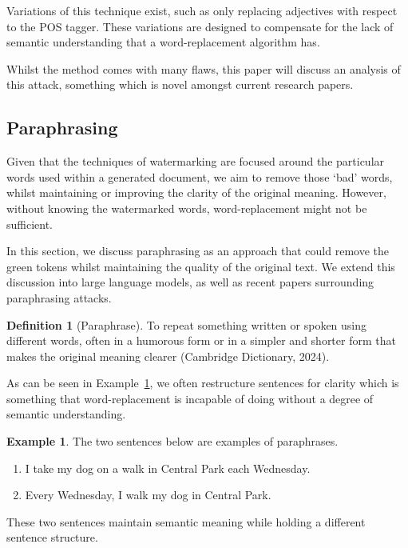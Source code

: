 \documentclass{l4proj}
\theoremstyle{definition}
\newtheorem{definition}{Definition}[section]
\newtheorem{example}{Example}[section]
\begin{document}
        Variations of this technique exist, such as only replacing adjectives with respect to the POS tagger. These variations are designed to compensate for the lack of semantic understanding that a word-replacement algorithm has.

        Whilst the method comes with many flaws, this paper will discuss an analysis of this attack, something which is novel amongst current research papers.
    
    \subsection{Paraphrasing}
        Given that the techniques of watermarking are focused around the particular words used within a generated document, we aim to remove those `bad' words, whilst maintaining or improving the clarity of the original meaning. However, without knowing the watermarked words, word-replacement might not be sufficient. 

        In this section, we discuss paraphrasing as an approach that could remove the green tokens whilst maintaining the quality of the original text. We extend this discussion into large language models, as well as recent papers surrounding paraphrasing attacks.

        \begin{definition}[Paraphrase]
            \label{def:paraphrase}
            To repeat something written or spoken using different words, often in a humorous form or in a simpler and shorter form that makes the original meaning clearer (Cambridge Dictionary, 2024). %
        \end{definition}

        As can be seen in Example~\ref{example:paraphrase}, we often restructure sentences for clarity which is something that word-replacement is incapable of doing without a degree of semantic understanding.

        \begin{example}
            \label{example:paraphrase}
            The two sentences below are examples of paraphrases.
            \begin{enumerate}[label=(\alph*)]
                \item I take my dog on a walk in Central Park each Wednesday. 
                \item Every Wednesday, I walk my dog in Central Park.
            \end{enumerate}
            These two sentences maintain semantic meaning while holding a different sentence structure. 
        \end{example}
\end{document}
